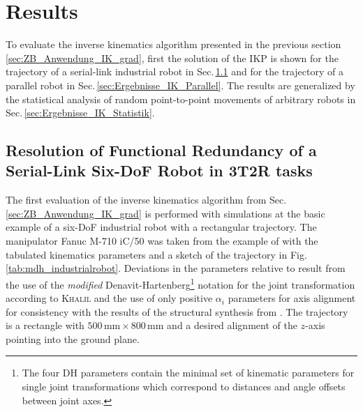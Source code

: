 \documentclass[robotics,article,submit,moreauthors,pdftex]{Definitions/mdpi}
\begin{document}
\section{Results}
\label{sec:Ergebnisse}

To evaluate the inverse kinematics algorithm presented in the previous section \ref{sec:ZB_Anwendung_IK_grad}, first the solution of the IKP is shown for the trajectory of a serial-link industrial robot in Sec.\,\ref{sec:Ergebnisse_Seriell} and for the trajectory of a parallel robot in Sec.\,\ref{sec:Ergebnisse_IK_Parallel}.
The results are generalized by the statistical analysis of random point-to-point movements of arbitrary robots in Sec.\,\ref{sec:Ergebnisse_IK_Statistik}.

\subsection{Resolution of Functional Redundancy of a Serial-Link Six-DoF Robot in 3T2R tasks}
\label{sec:Ergebnisse_Seriell}


The first evaluation of the inverse kinematics algorithm from Sec.\,\ref{sec:ZB_Anwendung_IK_grad} is performed with simulations at the basic example of a six-DoF industrial robot with a rectangular trajectory.
The manipulator Fanuc M-710 iC/50 was taken from the example of \cite{HuoBar2008} with the tabulated kinematics parameters and a sketch of the trajectory in Fig.\,\ref{tab:mdh_industrialrobot}.
Deviations in the parameters relative to \cite{HuoBar2008} result from the use of the \emph{modified} Denavit-Hartenberg\footnote{The four DH parameters contain the minimal set of kinematic parameters for single joint transformations which correspond to distances and angle offsets between joint axes.} notation for the joint transformation according to \textsc{Khalil} and the use of only positive $\alpha_i$ parameters for axis alignment for consistency with the results of the structural synthesis from \cite{RamirezKotOrt2015}.
The trajectory is a rectangle with $500\,\mathrm{mm} \times 800\,\mathrm{mm}$ and a desired alignment of the $z$-axis pointing into the ground plane.
\end{document}
